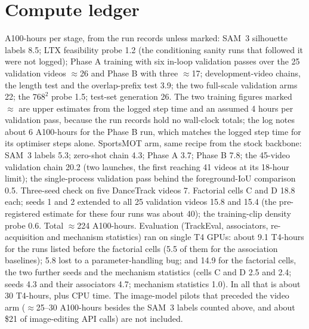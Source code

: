 \documentclass{article} %
\newcommand{\rev}[1]{#1}
\begin{document}
\section{Compute ledger}
\label{app:compute}
A100-hours per stage, from the run records \rev{unless marked}: SAM~3 silhouette labels 8.5; \rev{LTX
feasibility probe 1.2 (the conditioning sanity runs that followed it were not logged)}; Phase A
training with six in-loop validation passes over the 25 validation videos $\approx$26 \rev{and
Phase B with three $\approx$17; development-video chains, the
length test and the overlap-prefix test 3.9}; the two full-scale validation arms 22; the $768^2$ probe 1.5; test-set generation 26.
\rev{The two training figures marked $\approx$ are upper estimates from the logged step time and
an assumed 4 hours per validation pass, because the run records hold no wall-clock totals;
the log notes about 6 A100-hours for the Phase B run, which matches the logged step time
for its optimiser steps alone.}
SportsMOT arm, same recipe from the stock backbone: SAM~3 labels 5.3; zero-shot chain 4.3;
Phase A 3.7; Phase B 7.8; the 45-video validation chain 20.2 (two launches, the first
reaching 41 videos at its 18-hour limit); the single-process validation pass behind the
foreground-IoU comparison 0.5. Three-seed check on five DanceTrack videos 7.
\rev{Factorial cells C and D 18.8 each; seeds 1 and 2 extended to all 25
validation videos 15.8 and 15.4 (the pre-registered estimate for these four runs was about 40);
the training-clip density probe 0.6.} Total $\approx$\rev{224} A100-hours. \rev{Evaluation
(TrackEval, associators, re-acquisition and mechanism statistics) ran on single T4 GPUs:
about 9.1 T4-hours for the runs listed before the factorial cells (5.5 of them for the
association baselines); 5.8 lost to a parameter-handling bug; and 14.9 for the factorial
cells, the two further seeds and the mechanism statistics (cells C and D 2.5 and 2.4; seeds
4.3 and their associators 4.7; mechanism statistics 1.0). In all that is about 30 T4-hours,
plus CPU time.} The image-model pilots that
preceded the video arm ($\approx$\rev{25--30} A100-hours \rev{besides the SAM~3 labels counted
above}, and about \$21 of image-editing API calls) are not included.
\end{document}
